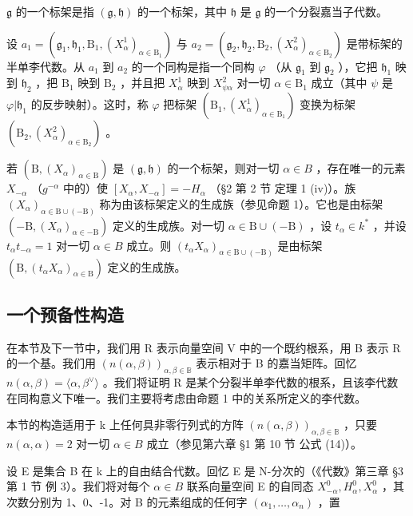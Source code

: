 \(\mathfrak{g}\) 的一个标架是指 \((\mathfrak{g},\mathfrak{h})\) 的一个标架，其中 \(\mathfrak{h}\) 是 \(\mathfrak{g}\) 的一个分裂嘉当子代数。

设 \(a_1 = (\mathfrak{g}_1, \mathfrak{h}_1, \mathrm{B}_1, (X_\alpha^1)_{\alpha \in \mathrm{B}_1})\) 与 \(a_2 = (\mathfrak{g}_2, \mathfrak{h}_2, \mathrm{B}_2, (X_\alpha^2)_{\alpha \in \mathrm{B}_2})\) 是带标架的半单李代数。从 \(a_1\) 到 \(a_2\) 的一个同构是指一个同构 \(\varphi\) （从 \(\mathfrak{g}_1\) 到 \(\mathfrak{g}_2\) ），它把 \(\mathfrak{h}_1\) 映到 \(\mathfrak{h}_2\) ，把 \(\mathrm{B}_1\) 映到 \(\mathrm{B}_2\) ，并且把 \(X_\alpha^1\) 映到 \(X_{\psi \alpha}^2\) 对一切 \(\alpha \in \mathrm{B}_1\) 成立（其中 \(\psi\) 是 \(\varphi | \mathfrak{h}_1\) 的反步映射）。这时，称 \(\varphi\) 把标架 \((\mathrm{B}_1, (X_\alpha^1)_{\alpha \in \mathrm{B}_1})\) 变换为标架 \((\mathrm{B}_2, (X_\alpha^2)_{\alpha \in \mathrm{B}_2})\) 。

若 \((\mathrm{B},(X_{\alpha})_{\alpha\in\mathrm{B}})\) 是 \((\mathfrak{g},\mathfrak{h})\) 的一个标架，则对一切 \(\alpha\in B\) ，存在唯一的元素 \(X_{-\alpha}\) （\(g^{-\alpha}\) 中的）使 \([X_{\alpha},X_{-\alpha}]=-H_{\alpha}\) （§2 第 2 节 定理 1 (iv)）。族 \((X_{\alpha})_{\alpha\in\mathrm{B}\cup(-\mathrm{B})}\) 称为由该标架定义的生成族（参见命题 1）。它也是由标架 \((-\mathrm{B},(X_{\alpha})_{\alpha\in-\mathrm{B}})\) 定义的生成族。对一切 \(\alpha\in\mathrm{B}\cup(-\mathrm{B})\) ，设 \(t_{\alpha}\in k^{*}\) ，并设 \(t_{\alpha}t_{-\alpha}=1\) 对一切 \(\alpha\in B\) 成立。则 \((t_{\alpha}X_{\alpha})_{\alpha\in\mathrm{B}\cup(-\mathrm{B})}\) 是由标架 \((\mathrm{B},(t_{\alpha}X_{\alpha})_{\alpha\in\mathrm{B}})\) 定义的生成族。

\subsection{一个预备性构造}

在本节及下一节中，我们用 R 表示向量空间 V 中的一个既约根系，用 B 表示 R 的一个基。我们用 \((n(\alpha,\beta))_{\alpha,\beta\in\mathbb{B}}\) 表示相对于 B 的嘉当矩阵。回忆 \(n(\alpha,\beta)=\langle\alpha,\beta^{\vee}\rangle\) 。我们将证明 R 是某个分裂半单李代数的根系，且该李代数在同构意义下唯一。我们主要将考虑由命题 1 中的关系所定义的李代数。

本节的构造适用于 k 上任何具非零行列式的方阵 \((n(\alpha,\beta))_{\alpha,\beta\in\mathbb{B}}\) ，只要 \(n(\alpha,\alpha)=2\) 对一切 \(\alpha\in B\) 成立（参见第六章 §1 第 10 节 公式 (14)）。

设 E 是集合 B 在 k 上的自由结合代数。回忆 E 是 N-分次的（《代数》第三章 §3 第 1 节 例 3）。我们将对每个 \(\alpha\in B\) 联系向量空间 E 的自同态 \(X_{-\alpha}^{0}, H_{\alpha}^{0}, X_{\alpha}^{0}\) ，其次数分别为 1、0、-1。对 B 的元素组成的任何字 \((\alpha_{1},\ldots,\alpha_{n})\) ，置

